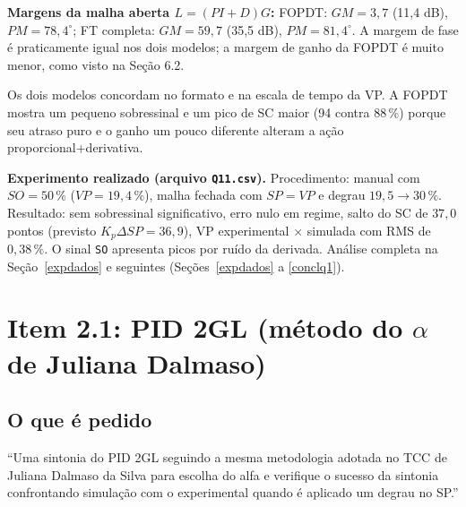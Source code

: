 \textbf{Margens da malha aberta $L=(PI+D)G$:} FOPDT: $GM=3{,}7$ (11,4 dB), $PM=78{,}4^\circ$; FT completa: $GM=59{,}7$ (35,5 dB), $PM=81{,}4^\circ$. A margem de fase é praticamente igual nos dois modelos; a margem de ganho da FOPDT é muito menor, como visto na Seção 6.2.
\begin{just}Os dois modelos concordam no formato e na escala de tempo da VP. A FOPDT mostra um pequeno sobressinal e um pico de SC maior (94 contra 88\,\%) porque seu atraso puro e o ganho um pouco diferente alteram a ação proporcional+derivativa.\end{just}
\begin{res}\textbf{Experimento realizado (arquivo \texttt{Q11.csv}).} Procedimento: manual com $SO=50\,\%$ ($VP=19{,}4\,\%$), malha fechada com $SP=VP$ e degrau $19{,}5\to30\,\%$. Resultado: sem sobressinal significativo, erro nulo em regime, salto do SC de $37{,}0$ pontos (previsto $K_p\Delta SP=36{,}9$), VP experimental $\times$ simulada com RMS de $0{,}38\,\%$. O sinal \texttt{SO} apresenta picos por ruído da derivada. Análise completa na Seção~\ref{expdados} e seguintes (Seções~\ref{expdados} a \ref{conclq1}).\end{res}

\section{Item 2.1: PID 2GL (método do $\alpha$ de Juliana Dalmaso)}\label{it21}
\subsection{O que é pedido}
``Uma sintonia do PID 2GL seguindo a mesma metodologia adotada no TCC de Juliana Dalmaso da Silva para escolha do alfa e verifique o sucesso da sintonia confrontando simulação com o experimental quando é aplicado um degrau no SP.''

